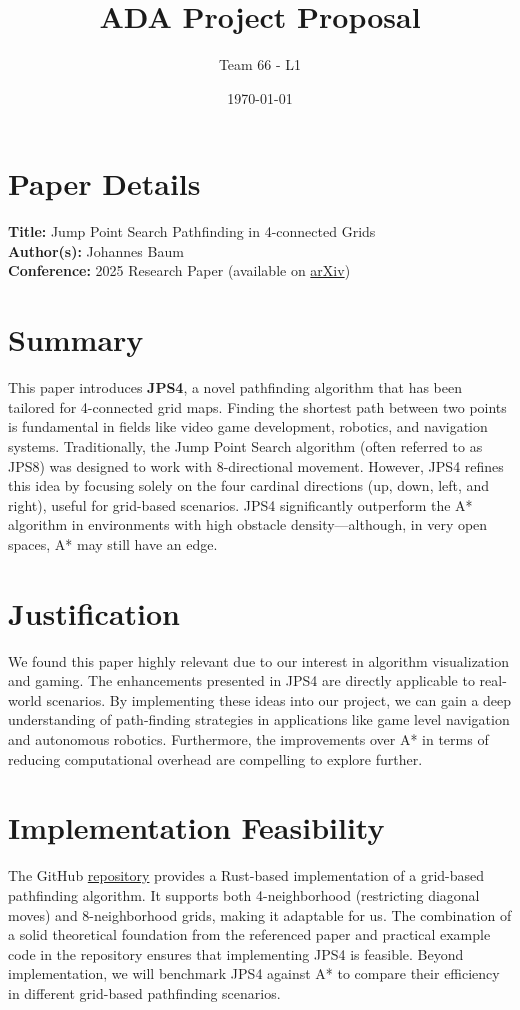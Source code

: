 \documentclass{article}
\title{ADA Project Proposal}
\author{Team 66 - L1}
\date{\today}
\begin{document}
\maketitle

\section{Paper Details}
\textbf{Title: } Jump Point Search Pathfinding in 4-connected Grids \\
\textbf{Author(s): } Johannes Baum \\
\textbf{Conference: } 2025 Research Paper (available on \href{https://arxiv.org/abs/2501.14816v1}{arXiv})

\section{Summary}
This paper introduces \textbf{JPS4}, a novel pathfinding algorithm that has been tailored for 4-connected grid maps. Finding the shortest path between two points is fundamental in fields like video game development, robotics, and navigation systems. Traditionally, the Jump Point Search algorithm (often referred to as JPS8) was designed to work with 8-directional movement. However, JPS4 refines this idea by focusing solely on the four cardinal directions (up, down, left, and right), useful for grid-based scenarios. JPS4 significantly outperform the A* algorithm in environments with high obstacle density—although, in very open spaces, A* may still have an edge.

\section{Justification}
We found this paper highly relevant due to our interest in algorithm visualization and gaming. The enhancements presented in JPS4 are directly applicable to real-world scenarios. By implementing these ideas into our project, we can gain a deep understanding of path-finding strategies in applications like game level navigation and autonomous robotics. Furthermore, the improvements over A* in terms of reducing computational overhead are compelling to explore further.

\section{Implementation Feasibility}
The GitHub \href{https://github.com/tbvanderwoude/grid_pathfinding}{repository} provides a Rust-based implementation of a grid-based pathfinding algorithm. It supports both 4-neighborhood (restricting diagonal moves) and 8-neighborhood grids, making it adaptable for us. The combination of a solid theoretical foundation from the referenced paper and practical example code in the repository ensures that implementing JPS4 is feasible. Beyond implementation, we will benchmark JPS4 against A* to compare their efficiency in different grid-based pathfinding scenarios.
\end{document}
